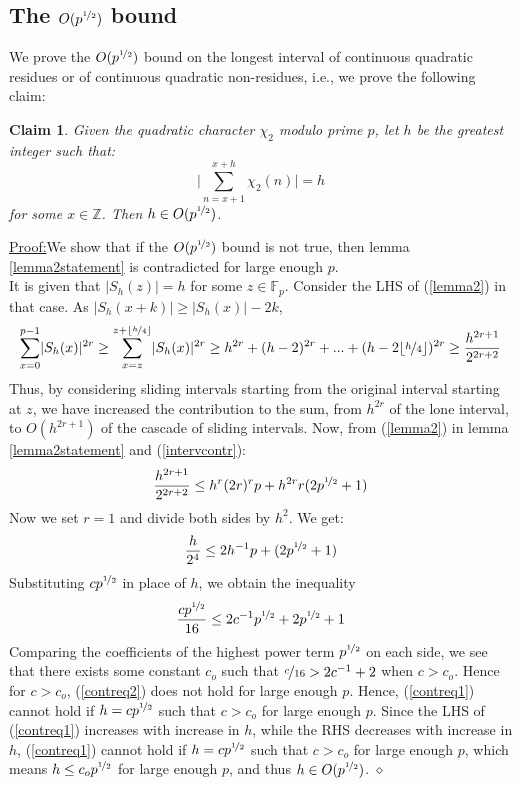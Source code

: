 \documentclass{report}
\newtheorem*{claim*}{Claim}
\newenvironment{claimproof}[1]{\vspace{2.5mm}\par\noindent\underline{Proof:}\space#1}{\hfill $\diamond$ \vspace{2.5mm} \par}
\begin{document}
\subsection*{The $O(p^{\nicefrac{1}{2}})$ bound}
We prove the $O(p^{\nicefrac{1}{2}})$ bound on the longest interval of continuous quadratic residues or of continuous quadratic non-residues, i.e., we prove the following claim:
\begin{claim*}
Given the quadratic character $\chi_2$ modulo prime $p$, let $h$ be the greatest integer such that:
\[\bigg\lvert\sum\limits_{n=x+1}^{x+h}\chi_2(n)\bigg\rvert=h\]
 for some $x\in\mathbb{Z}$. Then $h\in O(p^{\nicefrac{1}{2}})$.
\end{claim*}
\begin{claimproof}
We show that if the $O(p^{\nicefrac{1}{2}})$ bound is not true, then lemma \ref{lemma2statement} is contradicted for large enough $p$.\\
It is given that $\lvert S_h(z)\rvert=h$ for some $z\in \mathbb{F}_p$. Consider the LHS of (\ref{lemma2}) in that case. As $\lvert S_h(x+k)\rvert \geq \lvert S_h(x)\rvert-2k$,
\begin{equation} \label{intervcontr}
\sum\limits_{x=0}^{p-1}\lvert S_h(x)\rvert^{2r}\geq\sum\limits_{x=z}^{z+\lfloor\nicefrac{h}{4}\rfloor}\lvert S_h(x)\rvert^{2r} \geq h^{2r}+(h-2)^{2r}+...+(h-2\lfloor\nicefrac{h}{4}\rfloor)^{2r} \geq \frac{h^{2r+1}}{2^{2r+2}}
\end{equation}
Thus, by considering sliding intervals starting from the original interval starting at $z$, we have increased the contribution to the sum, from $h^{2r}$ of the lone interval, to $O(h^{2r+1})$ of the cascade of sliding intervals. Now, from (\ref{lemma2}) in lemma \ref{lemma2statement} and (\ref{intervcontr}):
$$ \frac{h^{2r+1}}{2^{2r+2}} \leq h^{r}(2r)^{r}p+h^{2r}r(2p^{\nicefrac{1}{2}}+1)$$
Now we set $r=1$ and divide both sides by $h^{2}$. We get:
\begin{equation} \label{contreq1}
\frac{h}{2^{4}} \leq 2h^{-1}p+(2p^{\nicefrac{1}{2}}+1)
\end{equation}
Substituting $cp^{\nicefrac{1}{2}}$ in place of $h$, we obtain the inequality
\begin{equation} \label{contreq2}
\frac{cp^{\nicefrac{1}{2}}}{16} \leq 2c^{-1}p^{\nicefrac{1}{2}}+2p^{\nicefrac{1}{2}}+1
\end{equation}
Comparing the coefficients of the highest power term $p^{\nicefrac{1}{2}}$ on each side, we see that there exists some constant $c_o$ such that $\nicefrac{c}{16}>2c^{-1}+2$ when $c>c_o$. Hence for $c>c_o$, (\ref{contreq2}) does not hold for large enough $p$. Hence, (\ref{contreq1}) cannot hold if $h=cp^{\nicefrac{1}{2}}$ such that $c>c_o$ for large enough $p$. Since the LHS of (\ref{contreq1}) increases with increase in $h$, while the RHS decreases with increase in $h$, (\ref{contreq1}) cannot hold if $h=cp^{\nicefrac{1}{2}}$ such that $c>c_o$ for large enough $p$, which means $h\leq c_op^{\nicefrac{1}{2}}$ for large enough $p$, and thus $h\in O(p^{\nicefrac{1}{2}})$.
\end{claimproof}
%
%
\end{document}
